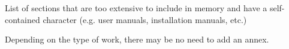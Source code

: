 

List of sections that are too extensive to include in memory and have a self-contained character (e.g. user manuals, installation manuals, etc.)
 
Depending on the type of work, there may be no need to add an annex.